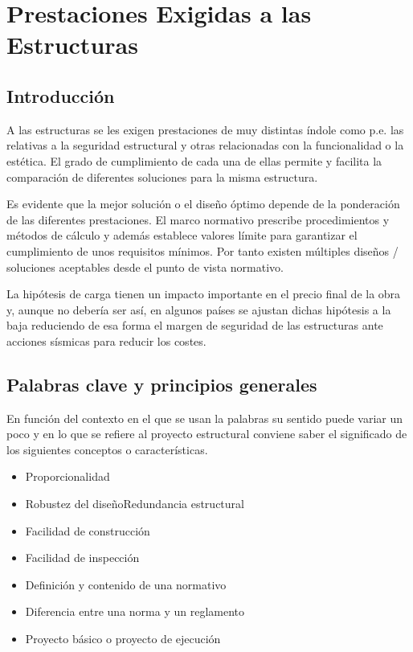 \chapter{Prestaciones Exigidas a las Estructuras}
\section{Introducción}
A las estructuras se les exigen prestaciones de muy distintas índole como p.e. las relativas a la seguridad estructural y otras relacionadas con la funcionalidad o la estética. El grado de cumplimiento de cada una de ellas permite y facilita la comparación de diferentes soluciones para la misma estructura.

Es evidente que la mejor solución o el diseño óptimo depende de la ponderación de las diferentes prestaciones. El marco normativo prescribe procedimientos y métodos de cálculo y además establece valores límite para garantizar el cumplimiento de unos requisitos mínimos. Por tanto existen múltiples diseños / soluciones aceptables desde el punto de vista normativo.

La hipótesis de carga tienen un impacto importante en el precio final de la obra y, aunque no debería ser así, en algunos países se ajustan dichas hipótesis a la baja reduciendo de esa forma el margen de seguridad de las estructuras ante acciones sísmicas para reducir los costes.

\section{Palabras clave y principios generales}
En función del contexto en el que se usan la palabras su sentido puede variar un poco y en lo que se refiere al proyecto estructural conviene saber el significado de los siguientes conceptos o características.


\begin{itemize}
    \item Proporcionalidad
    \item Robustez del diseñoRedundancia estructural
    \item Facilidad de construcción
    \item Facilidad de inspección
    \item Definición y contenido de una normativo
    \item Diferencia entre una norma y un reglamento
    \item Proyecto básico o proyecto de ejecución
\end{itemize}

